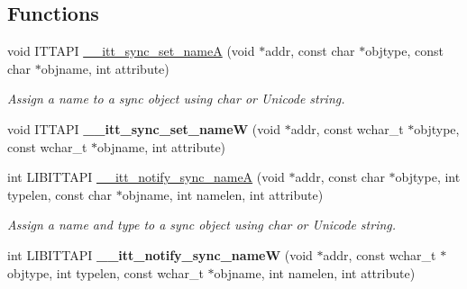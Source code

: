 \subsection*{Functions}
\begin{DoxyCompactItemize}
\item 
void I\+T\+T\+A\+P\+I \hyperlink{group__legacy__sync_ga8e63e2fa02de5df802490554d8ff0a41}{\+\_\+\+\_\+itt\+\_\+sync\+\_\+set\+\_\+name\+A} (void $\ast$addr, const char $\ast$objtype, const char $\ast$objname, int attribute)
\begin{DoxyCompactList}\small\item\em Assign a name to a sync object using char or Unicode string. \end{DoxyCompactList}\item 
\hypertarget{group__legacy__sync_gae6b1c1bc3819b2dd79cf92d5b85cb4c0}{}void I\+T\+T\+A\+P\+I {\bfseries \+\_\+\+\_\+itt\+\_\+sync\+\_\+set\+\_\+name\+W} (void $\ast$addr, const wchar\+\_\+t $\ast$objtype, const wchar\+\_\+t $\ast$objname, int attribute)\label{group__legacy__sync_gae6b1c1bc3819b2dd79cf92d5b85cb4c0}

\item 
int L\+I\+B\+I\+T\+T\+A\+P\+I \hyperlink{group__legacy__sync_gaa9a3eba5828bf261c60fc84e23c98ae1}{\+\_\+\+\_\+itt\+\_\+notify\+\_\+sync\+\_\+name\+A} (void $\ast$addr, const char $\ast$objtype, int typelen, const char $\ast$objname, int namelen, int attribute)
\begin{DoxyCompactList}\small\item\em Assign a name and type to a sync object using char or Unicode string. \end{DoxyCompactList}\item 
\hypertarget{group__legacy__sync_ga11ad57a229eaaeb89a59f75891ae7c27}{}int L\+I\+B\+I\+T\+T\+A\+P\+I {\bfseries \+\_\+\+\_\+itt\+\_\+notify\+\_\+sync\+\_\+name\+W} (void $\ast$addr, const wchar\+\_\+t $\ast$objtype, int typelen, const wchar\+\_\+t $\ast$objname, int namelen, int attribute)\label{group__legacy__sync_ga11ad57a229eaaeb89a59f75891ae7c27}


\end{DoxyCompactItemize}
